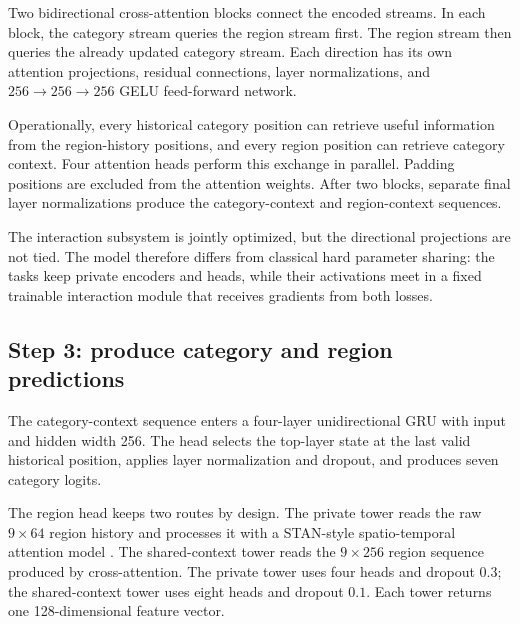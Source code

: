 Two bidirectional cross-attention blocks connect the encoded streams. In each
block, the category stream queries the region stream first. The region stream then
queries the already updated category stream. Each direction has its own attention
projections, residual connections, layer normalizations, and
$256\rightarrow256\rightarrow256$ GELU feed-forward network.

Operationally, every historical category position can retrieve useful information
from the region-history positions, and every region position can retrieve category
context. Four attention heads perform this exchange in parallel. Padding positions
are excluded from the attention weights. After two blocks, separate final layer
normalizations produce the category-context and region-context sequences.

The interaction subsystem is jointly optimized, but the directional projections
are not tied. The model therefore differs from classical hard parameter sharing:
the tasks keep private encoders and heads, while their activations meet in a fixed
trainable interaction module that receives gradients from both losses.

\subsection{Step 3: produce category and region predictions}

The category-context sequence enters a four-layer unidirectional GRU with input and
hidden width 256. The head selects the top-layer state at the last valid historical
position, applies layer normalization and dropout, and produces seven category
logits.

The region head keeps two routes by design. The private tower reads the raw
$9\times64$ region history and processes it with a STAN-style spatio-temporal
attention model \cite{luo2021stan}. The shared-context tower reads the
$9\times256$ region sequence produced by cross-attention. The private tower uses
four heads and dropout $0.3$; the shared-context tower uses eight heads and dropout
$0.1$. Each tower returns one 128-dimensional feature vector.

